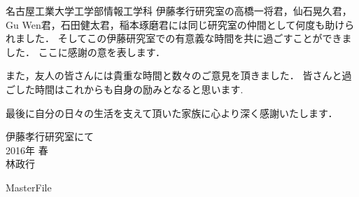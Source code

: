 名古屋工業大学工学部情報工学科 伊藤孝行研究室の高橋一将君，仙石晃久君，Gu Wen君，石田健太君，稲本琢磨君には同じ研究室の仲間として何度も助けられました．
そしてこの伊藤研究室での有意義な時間を共に過ごすことができました．
ここに感謝の意を表します． \par
\vspace{0.5cm}

また，友人の皆さんには貴重な時間と数々のご意見を頂きました．
皆さんと過ごした時間はこれからも自身の励みとなると思います.\par
\vspace{0.5cm}

最後に自分の日々の生活を支えて頂いた家族に心より深く感謝いたします．

\begin{flushright}
伊藤孝行研究室にて\\
2016年 春\\
林政行
\end{flushright}
\expandafter\ifx\csname MasterFile\endcsname\relax

\fi
